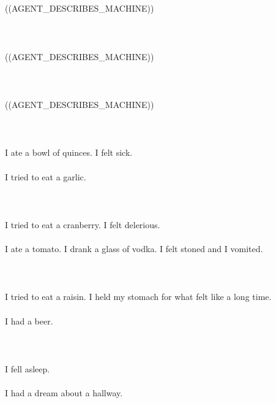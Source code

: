 \documentclass{article}
\begin{document}
    \newpage
    
    \section{}
    ((AGENT_DESCRIBES_MACHINE))\\\\ 
    \newpage
    
    \section{}
    ((AGENT_DESCRIBES_MACHINE))\\\\ 
    \newpage
    
    \section{}
    ((AGENT_DESCRIBES_MACHINE))\\\\ 
    \newpage
    
    \section{}
    I ate a bowl of quinces. I felt sick.\\\\I tried to eat a garlic.\\\\ 
    \newpage
    
    \section{}
    I tried to eat a cranberry. I felt delerious.\\\\I ate a tomato. I drank a glass of vodka. I felt stoned and I vomited.\\\\ 
    \newpage
    
    \section{}
    I tried to eat a raisin. I held my stomach for what felt like a long time.\\\\I had a beer.\\\\ 
    \newpage
    
    \section{}
    I fell asleep.\\\\I had a dream about a hallway.\\\\ 
    \newpage
    
    
\end{document}
